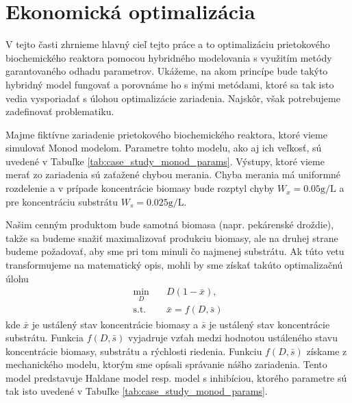 \section{Ekonomická optimalizácia}
V tejto časti zhrnieme hlavný cieľ tejto práce a to optimalizáciu prietokového biochemického reaktora pomocou hybridného modelovania s využitím metódy garantovaného odhadu parametrov. Ukážeme, na akom princípe bude takýto hybridný model fungovať a porovnáme ho s inými metódami, ktoré sa tak isto vedia vysporiadať s úlohou optimalizácie zariadenia. Najskôr, však potrebujeme zadefinovať problematiku.

Majme fiktívne zariadenie prietokového biochemického reaktora, ktoré vieme simulovať Monod modelom. Parametre tohto modelu, ako aj ich veľkosť, sú uvedené v Tabuľke \ref{tab:case_study_monod_params}. Výstupy, ktoré vieme merať zo zariadenia sú zaťažené chybou merania. Chyba merania má uniformné rozdelenie a v prípade koncentrácie biomasy bude rozptyl chyby
$ W_{x} = 0.05\si{\gram\per\liter} $ a pre koncentráciu substrátu $ W_{s} = 0.025\si{\gram\per\liter} $.

Našim cenným produktom bude samotná biomasa (napr. pekárenské droždie), takže sa budeme snažiť maximalizovať produkciu biomasy, ale na druhej strane budeme požadovať, aby sme pri tom minuli čo najmenej substrátu. Ak túto vetu transformujeme na matematický opis, 
mohli by sme získať takúto optimalizačnú úlohu
\begin{equation}
	\label{eq:chemostat_opt_general}
	\begin{split}
		\min_{D} &\quad D\left(1-\bar{x}\right), \\
		\text{s.t.} &\quad \bar{x} = f(D,\bar{s})
	\end{split}
\end{equation}
kde $ \bar{x} $ je ustálený stav koncentrácie biomasy a $ \bar{s} $ je ustálený stav koncentrácie substrátu. Funkcia $ f(D,\bar{s}) $ vyjadruje vzťah medzi hodnotou ustáleného stavu koncentrácie biomasy, substrátu a rýchlosti riedenia. Funkciu $ f(D,\bar{s}) $ získame z mechanického modelu, ktorým sme opísali správanie nášho zariadenia. Tento model predstavuje Haldane model resp. model s inhibíciou, ktorého parametre sú tak isto uvedené v Tabuľke \ref{tab:case_study_monod_params}. 

